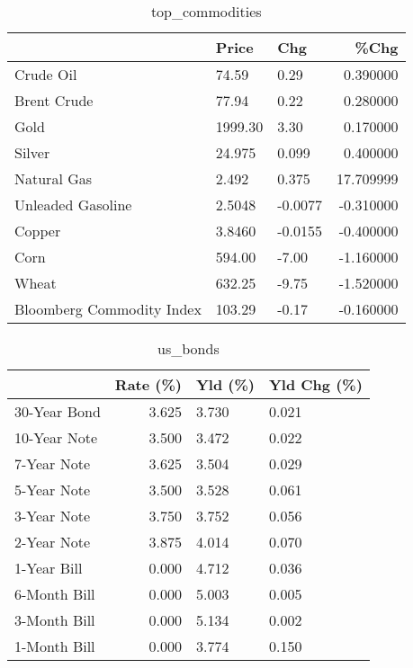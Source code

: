 \documentclass{article}%
\begin{document}
\begin{table}[htbp]%
\caption{top\_commodities}%
\centering%
\begin{adjustbox}{width=1\textwidth}%
\begin{tabular}{lllr}
\toprule
                          &   Price &     Chg &      \%Chg \\
\midrule
               Crude Oil  &   74.59 &    0.29 &  0.390000 \\
             Brent Crude  &   77.94 &    0.22 &  0.280000 \\
                    Gold  & 1999.30 &    3.30 &  0.170000 \\
                  Silver  &  24.975 &   0.099 &  0.400000 \\
             Natural Gas  &   2.492 &   0.375 & 17.709999 \\
       Unleaded Gasoline  &  2.5048 & -0.0077 & -0.310000 \\
                  Copper  &  3.8460 & -0.0155 & -0.400000 \\
                    Corn  &  594.00 &   -7.00 & -1.160000 \\
                   Wheat  &  632.25 &   -9.75 & -1.520000 \\
Bloomberg Commodity Index &  103.29 &   -0.17 & -0.160000 \\
\bottomrule
\end{tabular}
%
\end{adjustbox}%
\end{table}

%


\begin{table}[htbp]%
\caption{us\_bonds}%
\centering%
\begin{adjustbox}{width=1\textwidth}%
\begin{tabular}{lrll}
\toprule
             &  Rate (\%) & Yld (\%) & Yld Chg (\%) \\
\midrule
30-Year Bond &     3.625 &   3.730 &       0.021 \\
10-Year Note &     3.500 &   3.472 &       0.022 \\
 7-Year Note &     3.625 &   3.504 &       0.029 \\
 5-Year Note &     3.500 &   3.528 &       0.061 \\
 3-Year Note &     3.750 &   3.752 &       0.056 \\
 2-Year Note &     3.875 &   4.014 &       0.070 \\
 1-Year Bill &     0.000 &   4.712 &       0.036 \\
6-Month Bill &     0.000 &   5.003 &       0.005 \\
3-Month Bill &     0.000 &   5.134 &       0.002 \\
1-Month Bill &     0.000 &   3.774 &       0.150 \\
\bottomrule
\end{tabular}
%
\end{adjustbox}%
\end{table}
\end{document}

